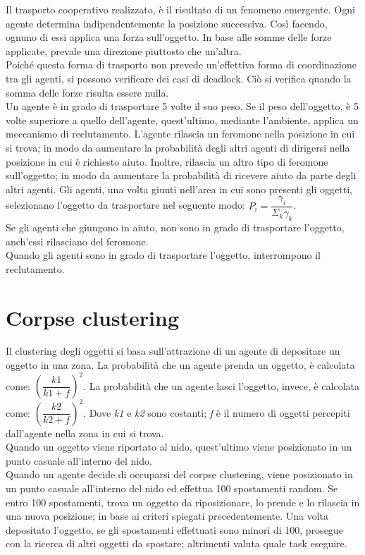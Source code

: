 \documentclass[12pt,a4paper,openright,twoside]{report}
\begin{document}
Il trasporto cooperativo realizzato, è il risultato di un fenomeno emergente. Ogni agente determina indipendentemente la posizione successiva. Così facendo, ognuno di essi applica una forza sull'oggetto. In base alle somme delle forze applicate, prevale una direzione piuttosto che un'altra.\\
Poiché questa forma di trasporto non prevede un'effettiva forma di coordinazione tra gli agenti, si possono verificare dei casi di deadlock. Ciò si verifica quando la somma delle forze risulta essere nulla.\\
Un agente è in grado di trasportare 5 volte il suo peso. Se il peso dell'oggetto, è 5 volte superiore a quello dell'agente, quest'ultimo, mediante l'ambiente, applica un meccanismo di reclutamento. L'agente rilascia un feromone nella posizione in cui si trova; in modo da aumentare la probabilità degli altri agenti di dirigersi nella posizione in cui è richiesto aiuto. Inoltre, rilascia un altro tipo di feromone sull'oggetto; in modo da aumentare la probabilità di ricevere aiuto da parte degli altri agenti. Gli agenti, una volta giunti nell'area in cui sono presenti gli oggetti, selezionano l'oggetto da trasportare nel seguente modo: $P_i =\dfrac{\gamma_i}{\Sigma_k \gamma_k}$.\\
Se gli agenti che giungono in aiuto, non sono in grado di trasportare l'oggetto, anch'essi rilasciano del feromone.\\
Quando gli agenti sono in grado di trasportare l'oggetto, interrompono il reclutamento.

\section{Corpse clustering}

Il clustering degli oggetti si basa sull'attrazione di un agente di depositare un oggetto in una zona. La probabilità che un agente prenda un oggetto, è calcolata come: $(\dfrac{k1}{k1+f})^2$. La probabilità che un agente lasci l'oggetto, invece, è calcolata come: $(\dfrac{k2}{k2+f})^2$. Dove \textit{k1} e \textit{k2} sono costanti; \textit{f} è il numero di oggetti percepiti dall'agente nella zona in cui si trova.\\
Quando un oggetto viene riportato al nido, quest'ultimo viene posizionato in un punto casuale all'interno del nido.\\
Quando un agente decide di occuparsi del corpse clustering, viene posizionato in un punto casuale all'interno del nido ed effettua 100 spostamenti random. Se entro 100 spostamenti, trova un oggetto da riposizionare, lo prende e lo rilascia in una nuova posizione; in base ai criteri spiegati precedentemente. Una volta depositato l'oggetto, se gli spostamenti effettuati sono minori di 100, prosegue con la ricerca di altri oggetti da spostare; altrimenti valuta quale task eseguire.
\end{document}
